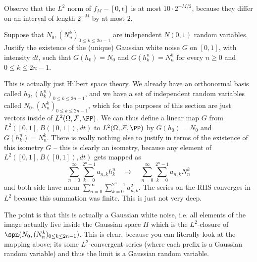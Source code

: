 \documentclass{scrartcl}
\begin{document}
Observe that the $L^2$ norm of $f_M - [0,t]$ is at most $10 \cdot 2^{-M/2}$, because they differ on an interval of length $2^{-M}$ by at most $2$.


\begin{prob}
    Suppose that $N_0, (N_n^k)_{0 \leq k \leq 2n-1}$ are independent $N(0,1)$ random variables. Justify the existence of the (unique) Gaussian white noise $G$ on $[0,1]$, with intensity $dt$, such that $G(h_0) = N_0$ and $G(h^n_k) = N_n^k$ for every $n \geq 0$ and $0 \leq k \leq 2n-1$.
\end{prob}

This is actually just Hilbert space theory. We already have an orthonormal basis called $h_0, (h^n_k)_{0 \leq k \leq 2n-1}$, and we have a set of independent random variables called $N_0, (N_n^k)_{0 \leq k \leq 2n-1}$, which for the purposes of this section are just vectors inside of $L^2(\Omega, \mathcal{F}, \PP)$. We can thus define a linear map $G$ from $L^2([0,1], B([0,1]), dt)$ to $L^2(\Omega, \mathcal{F}, \PP)$ by $G(h_0) = N_0$ and $G(h^n_k) = N_n^k$. There is really nothing else to justify in terms of the existence of this isometry $G$ -- this is clearly an isometry, because any element of $L^2([0,1], B([0,1]), dt)$ gets mapped as 
\[
    \sum_{n=0}^\infty \sum_{k=0}^{2^n-1} a_{n,k}h^n_k \quad \mapsto \quad \sum_{n=0}^\infty \sum_{k=0}^{2^n-1} a_{n,k}N_n^k
\]
and both side have norm $\sum_{n=0}^\infty \sum_{k=0}^{2^n-1} a_{n,k}^2$. The series on the RHS converges in $L^2$ because this summation was finite. This is just not very deep.

The point is that this is actually a Gaussian white noise, i.e. all elements of the image actually live inside the Gaussian space $H$ which is the $L^2$-closure of $\spn(N_0, (N_n^k)_{0 \leq k \leq 2n-1})$. This is clear, because you can literally look at the mapping above; its some $L^2$-convergent series (where each prefix is a Gaussian random variable) and thus the limit is a Gaussian random variable.
\end{document}
